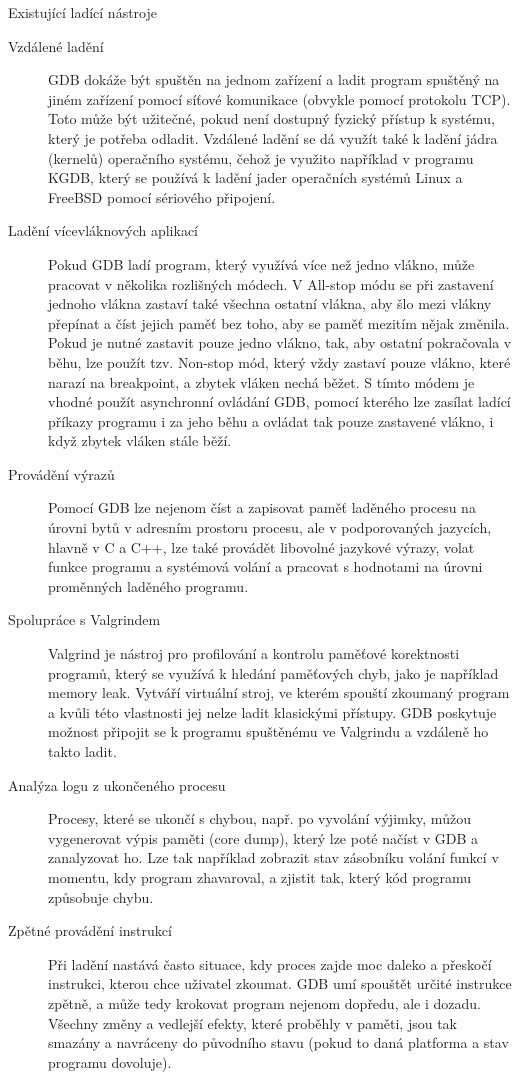 \documentclass[bc,male,python,dept460]{diploma}						%
\begin{document}
\begin{section}{Existující ladící nástroje}
		\begin{description}
			\item[Vzdálené ladění]
				GDB dokáže být spuštěn na jednom zařízení a ladit program spuštěný na jiném zařízení pomocí síťové komunikace (obvykle pomocí protokolu TCP).
				Toto může být užitečné, pokud není dostupný fyzický přístup k systému, který je potřeba odladit.
				Vzdálené ladění se dá využít také k ladění jádra (kernelů) operačního systému, čehož je využito například v programu KGDB, který se používá k ladění
				jader operačních systémů Linux a FreeBSD pomocí sériového připojení.
			\item[Ladění vícevláknových aplikací]
				Pokud GDB ladí program, který využívá více než jedno vlákno, může pracovat v několika rozlišných módech\cite{gdb-multithreading}.
				V All-stop módu se při zastavení jednoho vlákna zastaví také všechna ostatní vlákna, aby šlo mezi vlákny přepínat a číst jejich paměť bez toho,
				aby se paměť mezitím nějak změnila. Pokud je nutné zastavit pouze jedno vlákno, tak, aby ostatní pokračovala v běhu, lze použít tzv. Non-stop mód,
				který vždy zastaví pouze vlákno, které narazí na breakpoint, a zbytek vláken nechá běžet. S tímto módem je vhodné použít asynchronní ovládání GDB,
				pomocí kterého lze zasílat ladící příkazy programu i za jeho běhu a ovládat tak pouze zastavené vlákno, i když zbytek vláken stále běží.
			\item[Provádění výrazů]
				Pomocí GDB lze nejenom číst a zapisovat paměť laděného procesu na úrovni bytů v adresním prostoru procesu, ale v podporovaných jazycích, hlavně
				v C a C++, lze také provádět libovolné jazykové výrazy, volat funkce programu a systémová volání a pracovat s hodnotami na úrovni proměnných
				laděného programu.
			\item[Spolupráce s Valgrindem]
				Valgrind je nástroj pro profilování a kontrolu paměťové korektnosti programů, který se využívá k hledání paměťových chyb, jako je například memory
				leak. Vytváří virtuální stroj, ve kterém spouští zkoumaný program a kvůli této vlastnosti jej nelze ladit klasickými přístupy. GDB poskytuje
				možnost připojit se k programu spuštěnému ve Valgrindu a vzdáleně ho takto ladit.
			\item[Analýza logu z ukončeného procesu]
				Procesy, které se ukončí s chybou, např. po vyvolání výjimky, můžou vygenerovat výpis paměti (core dump), který lze poté načíst v GDB a zanalyzovat ho.
				Lze tak například zobrazit stav zásobníku volání funkcí v momentu, kdy program zhavaroval, a zjistit tak, který kód programu způsobuje chybu.
			\item[Zpětné provádění instrukcí]
				Při ladění nastává často situace, kdy proces zajde moc daleko a přeskočí instrukci, kterou chce uživatel zkoumat. GDB umí spouštět určité instrukce
				zpětně, a může tedy krokovat program nejenom dopředu, ale i dozadu. Všechny změny a vedlejší efekty, které proběhly v paměti, jsou tak smazány a
				navráceny do původního stavu (pokud to daná platforma a stav programu dovoluje).
		\end{description}
		

\end{section}
\end{document}
